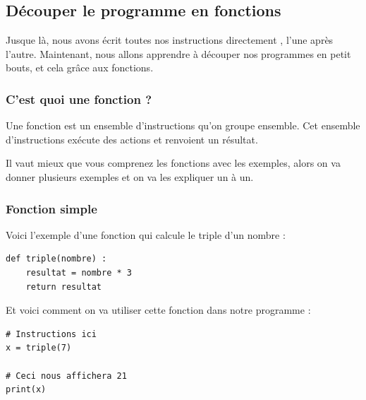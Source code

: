 \documentclass[12pt]{article}
\begin{document}
\clearpage

    \subsection{Découper le programme en fonctions}
        Jusque là, nous avons écrit toutes nos instructions directement , l'une après l'autre. Maintenant, nous allons
        apprendre à découper nos programmes en petit bouts, et cela grâce aux fonctions.

        \subsubsection{C'est quoi une fonction ?}
            Une fonction est un ensemble d'instructions qu'on groupe ensemble. Cet ensemble d'instructions exécute
            des actions et renvoient un résultat.

            Il vaut mieux que vous comprenez les fonctions avec les exemples, alors on va donner plusieurs exemples
            et on va les expliquer un à un.

        \subsubsection{Fonction simple}

            Voici l'exemple d'une fonction qui calcule le triple d'un nombre :
            \begin{lstlisting}[style=code]
def triple(nombre) :
    resultat = nombre * 3
    return resultat
            \end{lstlisting}

            Et voici comment on va utiliser cette fonction dans notre programme :
            \begin{lstlisting}[style=code]
# Instructions ici
x = triple(7)

# Ceci nous affichera 21
print(x)
            \end{lstlisting}
\end{document}
